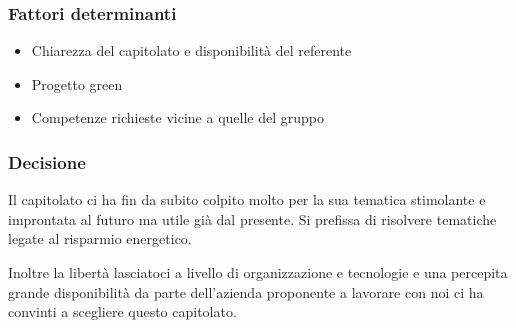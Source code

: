 \subsubsection{Fattori determinanti}
\begin{itemize}
    \item Chiarezza del capitolato e disponibilità del referente
    \item Progetto green
    \item Competenze richieste vicine a quelle del gruppo
\end{itemize}

\subsubsection{Decisione}
Il capitolato ci ha fin da subito colpito molto per la sua tematica stimolante e improntata al futuro ma utile già dal presente. Si prefissa di risolvere tematiche legate al risparmio energetico.

Inoltre la libertà lasciatoci a livello di organizzazione e tecnologie e una 
percepita grande disponibilità da parte dell'azienda proponente a lavorare con noi ci ha convinti a scegliere questo capitolato.
